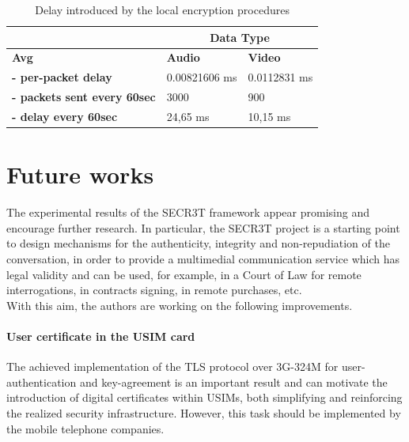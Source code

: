 \documentclass[10pt, conference, compsocconf]{IEEEtran}
\begin{document}
\begin{table}[htbp]
\caption{Delay introduced by the local encryption procedures}
\centering

\begin{tabular}{ l | l | l |}
\cline{2-3}
& \multicolumn{2}{|c|}{\textbf{Data Type}}\\
\hline
\multicolumn{1}{|l|}{\textbf{Avg}} & \textbf{Audio} & \textbf{Video}\\
\hline
\multicolumn{1}{|l|}{\textbf{- per-packet delay}} & 0.00821606 ms & 0.0112831 ms\\
\hline
\multicolumn{1}{|l|}{\textbf{- packets sent every 60sec}} & 3000 & 900 \\
\hline
\multicolumn{1}{|l|}{\textbf{- delay every 60sec}} & 24,65 ms & 10,15 ms\\
\hline
\end{tabular}

\label{tab:delay}
\end{table}


\section{Future works}
\label{par:future}

The experimental results of the SECR3T framework appear promising and encourage further research. In particular, the SECR3T project is a starting point to design mechanisms for the authenticity, integrity and non-repudiation of the conversation, in order to provide a multimedial communication service which has legal validity and can be used, for example, in a Court of Law for remote interrogations, in contracts signing, in remote purchases, etc.
\\

\noindent With this aim, the authors are working on the following improvements.
\\

\paragraph{User certificate in the USIM card}
The achieved implementation of the TLS protocol over 3G-324M for user-authentication and key-agreement is an important result and can motivate the introduction of digital certificates within USIMs, both simplifying and reinforcing the realized security infrastructure. However, this task should be implemented by the mobile telephone companies.
\\
\end{document}
